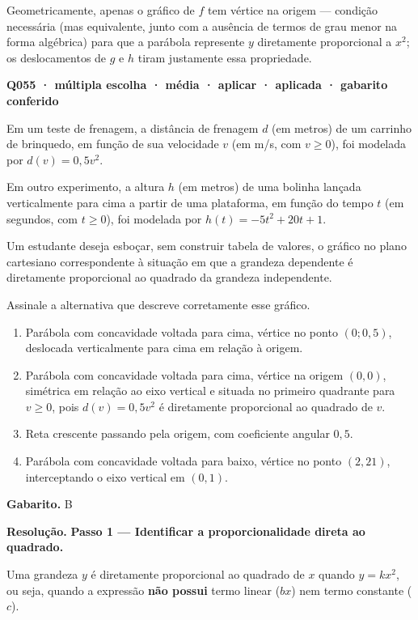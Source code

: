 \documentclass[11pt,a4paper]{article}
\begin{document}
Geometricamente, apenas o gráfico de $f$ tem vértice na origem — condição necessária (mas equivalente, junto com a ausência de termos de grau menor na forma algébrica) para que a parábola represente $y$ diretamente proporcional a $x^2$; os deslocamentos de $g$ e $h$ tiram justamente essa propriedade.

\bigskip\noindent\textbf{Q055 · múltipla escolha · média · aplicar · aplicada · gabarito conferido}\par\nopagebreak
Em um teste de frenagem, a distância de frenagem $d$ (em metros) de um carrinho de brinquedo, em função de sua velocidade $v$ (em m/s, com $v \geq 0$), foi modelada por $d(v) = 0{,}5v^2$.

Em outro experimento, a altura $h$ (em metros) de uma bolinha lançada verticalmente para cima a partir de uma plataforma, em função do tempo $t$ (em segundos, com $t \geq 0$), foi modelada por $h(t) = -5t^2 + 20t + 1$.

Um estudante deseja esboçar, sem construir tabela de valores, o gráfico no plano cartesiano correspondente à situação em que a grandeza dependente é diretamente proporcional ao quadrado da grandeza independente.

Assinale a alternativa que descreve corretamente esse gráfico.
\begin{enumerate}[label=(\alph*)]
\item Parábola com concavidade voltada para cima, vértice no ponto $(0; 0{,}5)$, deslocada verticalmente para cima em relação à origem.
\item Parábola com concavidade voltada para cima, vértice na origem $(0,0)$, simétrica em relação ao eixo vertical e situada no primeiro quadrante para $v \geq 0$, pois $d(v)=0{,}5v^2$ é diretamente proporcional ao quadrado de $v$.
\item Reta crescente passando pela origem, com coeficiente angular $0{,}5$.
\item Parábola com concavidade voltada para baixo, vértice no ponto $(2,21)$, interceptando o eixo vertical em $(0,1)$.
\end{enumerate}

\textbf{Gabarito.} B

\textbf{Resolução.} \textbf{Passo 1 — Identificar a proporcionalidade direta ao quadrado.}

Uma grandeza $y$ é diretamente proporcional ao quadrado de $x$ quando $y = kx^2$, ou seja, quando a expressão \textbf{não possui} termo linear ($bx$) nem termo constante ($c$).
\end{document}
